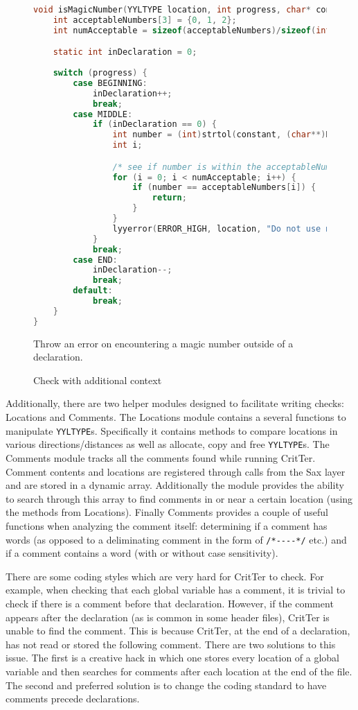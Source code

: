 \documentclass[12pt]{report}
\newcommand{\programName}{CritTer\xspace}
\begin{document}
\begin{figure}
\caption{Check with additional context}
\label{checkWithContext}
\begin{lstlisting}[language=C]
void isMagicNumber(YYLTYPE location, int progress, char* constant) {
	int acceptableNumbers[3] = {0, 1, 2};
	int numAcceptable = sizeof(acceptableNumbers)/sizeof(int);

	static int inDeclaration = 0;
	
	switch (progress) {
		case BEGINNING:
			inDeclaration++;
			break;
		case MIDDLE:
			if (inDeclaration == 0) {
				int number = (int)strtol(constant, (char**)NULL, 0);
				int i;

				/* see if number is within the acceptableNumbers array */
				for (i = 0; i < numAcceptable; i++) {
					if (number == acceptableNumbers[i]) {
						return;
					}
				}
				lyyerror(ERROR_HIGH, location, "Do not use magic numbers");
			}
			break;
		case END:
			inDeclaration--;
			break;
		default:
			break;
	}
}
\end{lstlisting}
\small{Throw an error on encountering a magic number outside of a declaration.}
\end{figure}

Additionally, there are two helper modules designed to facilitate writing checks: Locations and 
Comments. The Locations module contains a several functions to manipulate \lstinline{YYLTYPE}s.  
Specifically it contains methods to compare locations in various directions/distances as well as 
allocate, copy and free \lstinline{YYLTYPE}s. The Comments module tracks all the comments found 
while running \programName. Comment contents and locations are registered through calls from the 
Sax layer and are stored in a dynamic array. Additionally the module provides the ability to search 
through this array to find comments in or near a certain location (using the methods from Locations). 
Finally Comments provides a couple of useful functions when analyzing the comment itself: 
determining if a comment has words (as opposed to a deliminating comment in the form of 
\lstinline{/*----*/} etc.) and if a comment contains a word (with or without case sensitivity).

There are some coding styles which are very hard for \programName to check. For example, when 
checking that each global variable has a comment, it is trivial to check if there is a comment before that 
declaration. However, if the comment appears after the declaration (as is common in some header 
files), \programName is unable to find the comment. This is because \programName, at the end of a 
declaration, has not read or stored the following comment. There are two solutions to this issue. The 
first is a creative hack in which one stores every location of a global variable and then searches for 
comments after each location at the end of the file. The second and preferred solution is to change the 
coding standard to have comments precede declarations.
\end{document}
